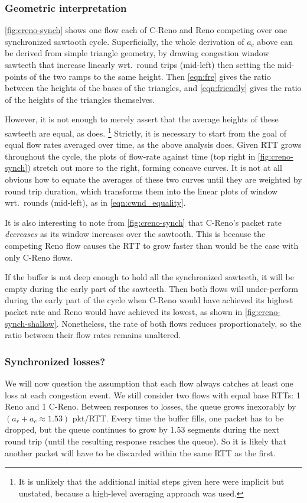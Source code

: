 \subsubsection{Geometric interpretation} 
\autoref{fig:creno-synch} shows one flow each of C-Reno and Reno competing over one synchronized sawtooth cycle. Superficially, the whole derivation of \(a_c\) above can be derived from simple triangle geometry, by drawing congestion window sawteeth that increase linearly wrt.\ round trips (mid-left) then setting the mid-points of the two ramps to the same height. Then \autoref{eqn:fre} gives the ratio between the heights of the bases of the triangles, and \autoref{eqn:friendly} gives the ratio of the heights of the triangles themselves.

However, it is not enough to merely assert that the average heights of these sawteeth are equal, as \cite{Floyd00:Eqn_v_AIMD_cc} does.%
\footnote{It is unlikely that the additional initial steps given here were implicit but unstated, because a high-level averaging approach was used.}
Strictly, it is necessary to start from the goal of equal flow rates averaged over time, as the above analysis does. Given RTT grows throughout the cycle, the plots of flow-rate against time (top right in \autoref{fig:creno-synch}) stretch out more to the right, forming concave curves. It is not at all obvious how to equate the averages of these two curves until they are weighted by round trip duration, which transforms them into the linear plots of window wrt.\ rounds (mid-left), as in \autoref{eqn:cwnd_equality}.

It is also interesting to note from \autoref{fig:creno-synch} that C-Reno's packet rate \emph{decreases} as its window increases over the sawtooth. This is because the competing Reno flow causes the RTT to grow faster than would be the case with only C-Reno flows. 

If the buffer is not deep enough to hold all the synchronized sawteeth, it will be empty during the early part of the sawteeth. Then both flows will under-perform during the early part of the cycle when C-Reno would have achieved its highest packet rate and Reno would have achieved its lowest, as shown in \autoref{fig:creno-synch-shallow}. Nonetheless, the rate of both flows reduces proportionately, so the ratio between their flow rates remains unaltered.

\subsubsection{Synchronized losses?}
We will now question the assumption that each flow always catches at least one loss at each congestion event. We still consider two flows with equal base RTTs: 1 Reno and 1 C-Reno. Between responses to losses, the queue grows inexorably by \((a_r + a_c \approx 1.53)\) pkt/RTT. Every time the buffer fills, one packet has to be dropped, but the queue continues to grow by 1.53 segments during the next round trip (until the resulting response reaches the queue). So it is likely that another packet will have to be discarded within the same RTT as the first.


